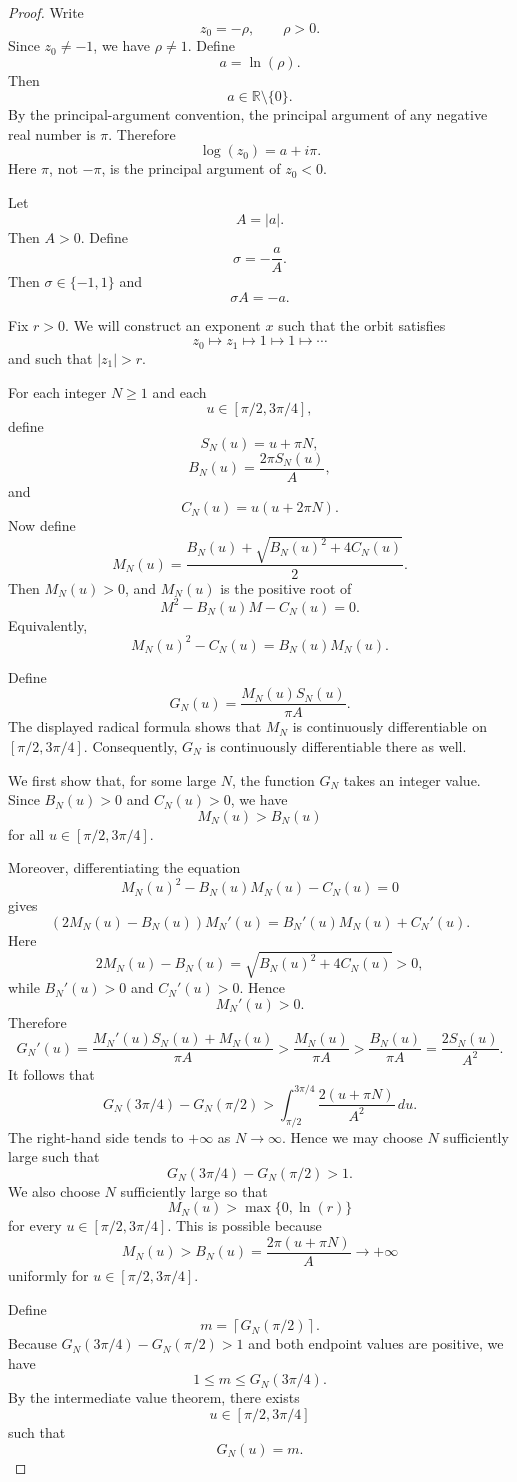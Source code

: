 \documentclass[12pt,a4paper]{amsart}
\theoremstyle{remark}
\newcommand{\R}{\mathbb{R}}
\begin{document}
\begin{proof}
Write
\[
z_0=-\rho,
\qquad
\rho>0.
\]
Since $z_0\ne -1$, we have $\rho\ne 1$. Define
\[
a=\ln(\rho).
\]
Then
\[
a\in\R\setminus\{0\}.
\]
By the principal-argument convention, the principal argument of any negative
real number is $\pi$. Therefore
\[
\log(z_0)=a+i\pi.
\]
Here $\pi$, not $-\pi$, is the principal argument of $z_0<0$.

Let
\[
A=|a|.
\]
Then $A>0$. Define
\[
\sigma=-\frac{a}{A}.
\]
Then $\sigma\in\{-1,1\}$ and
\[
\sigma A=-a.
\]

Fix $r>0$. We will construct an exponent $x$ such that the orbit satisfies
\[
z_0\mapsto z_1\mapsto 1\mapsto 1\mapsto \cdots
\]
and such that $|z_1|>r$.

For each integer $N\ge 1$ and each
\[
u\in[\pi/2,3\pi/4],
\]
define
\[
S_N(u)=u+\pi N,
\]
\[
B_N(u)=\frac{2\pi S_N(u)}{A},
\]
and
\[
C_N(u)=u(u+2\pi N).
\]
Now define
\[
M_N(u)
=
\frac{B_N(u)+\sqrt{B_N(u)^2+4C_N(u)}}{2}.
\]
Then $M_N(u)>0$, and $M_N(u)$ is the positive root of
\[
M^2-B_N(u)M-C_N(u)=0.
\]
Equivalently,
\[
M_N(u)^2-C_N(u)=B_N(u)M_N(u).
\]

Define
\[
G_N(u)=\frac{M_N(u)S_N(u)}{\pi A}.
\]
The displayed radical formula shows that $M_N$ is continuously
differentiable on $[\pi/2,3\pi/4]$. Consequently, $G_N$ is continuously
differentiable there as well.

We first show that, for some large $N$, the function $G_N$ takes an integer
value. Since $B_N(u)>0$ and $C_N(u)>0$, we have
\[
M_N(u)>B_N(u)
\]
for all $u\in[\pi/2,3\pi/4]$.

Moreover, differentiating the equation
\[
M_N(u)^2-B_N(u)M_N(u)-C_N(u)=0
\]
gives
\[
(2M_N(u)-B_N(u))M_N'(u)=B_N'(u)M_N(u)+C_N'(u).
\]
Here
\[
2M_N(u)-B_N(u)=\sqrt{B_N(u)^2+4C_N(u)}>0,
\]
while $B_N'(u)>0$ and $C_N'(u)>0$. Hence
\[
M_N'(u)>0.
\]
Therefore
\[
G_N'(u)
=
\frac{M_N'(u)S_N(u)+M_N(u)}{\pi A}
>
\frac{M_N(u)}{\pi A}
>
\frac{B_N(u)}{\pi A}
=
\frac{2S_N(u)}{A^2}.
\]
It follows that
\[
G_N(3\pi/4)-G_N(\pi/2)
>
\int_{\pi/2}^{3\pi/4}\frac{2(u+\pi N)}{A^2}\,du.
\]
The right-hand side tends to $+\infty$ as $N\to\infty$. Hence we may choose
$N$ sufficiently large such that
\[
G_N(3\pi/4)-G_N(\pi/2)>1.
\]
We also choose $N$ sufficiently large so that
\[
M_N(u)>\max\{0,\ln(r)\}
\]
for every $u\in[\pi/2,3\pi/4]$. This is possible because
\[
M_N(u)>B_N(u)=\frac{2\pi(u+\pi N)}{A}\to+\infty
\]
uniformly for $u\in[\pi/2,3\pi/4]$.

Define
\[
m=\left\lceil G_N(\pi/2)\right\rceil.
\]
Because $G_N(3\pi/4)-G_N(\pi/2)>1$ and both endpoint values are positive, we
have
\[
1\le m\le G_N(3\pi/4).
\]
By the intermediate value theorem, there exists
\[
u\in[\pi/2,3\pi/4]
\]
such that
\[
G_N(u)=m.
\]


\end{proof}
\end{document}
